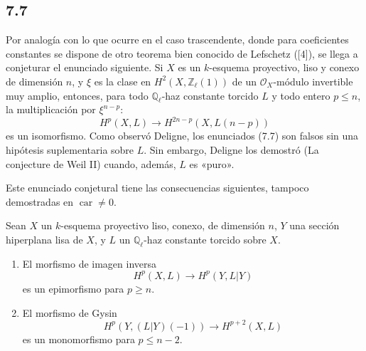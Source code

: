 \subsection*{7.7}

Por analogía con lo que ocurre en el caso trascendente, donde para coeficientes constantes se dispone de otro teorema bien conocido de Lefschetz ([4]), se llega a conjeturar el enunciado siguiente. Si $X$ es un $k$-esquema proyectivo, liso y conexo de dimensión $n$, y $\xi$ es la clase en $H^2(X,\mathbb Z_\ell(1))$ de un $\mathcal O_X$-módulo invertible muy amplio, entonces, para todo $\mathbb Q_\ell$-haz constante torcido $L$ y todo entero $p\le n$, la multiplicación por $\xi^{n-p}$:
\[
H^p(X,L)\to H^{2n-p}(X,L(n-p))
\]
es un isomorfismo. Como observó Deligne, los enunciados (7.7) son falsos sin una hipótesis suplementaria sobre $L$. Sin embargo, Deligne los demostró (La conjecture de Weil II) cuando, además, $L$ es «puro».

Este enunciado conjetural tiene las consecuencias siguientes, tampoco demostradas en $\operatorname{car}\ne0$.

Sean $X$ un $k$-esquema proyectivo liso, conexo, de dimensión $n$, $Y$ una sección hiperplana lisa de $X$, y $L$ un $\mathbb Q_\ell$-haz constante torcido sobre $X$.
\begin{enumerate}[label=(\roman*)]
\item El morfismo de imagen inversa
\[
H^p(X,L)\to H^p(Y,L|Y)
\]
es un epimorfismo para $p\ge n$.
\item El morfismo de Gysin
\[
H^p(Y,(L|Y)(-1))\to H^{p+2}(X,L)
\]
es un monomorfismo para $p\le n-2$.
\end{enumerate}
